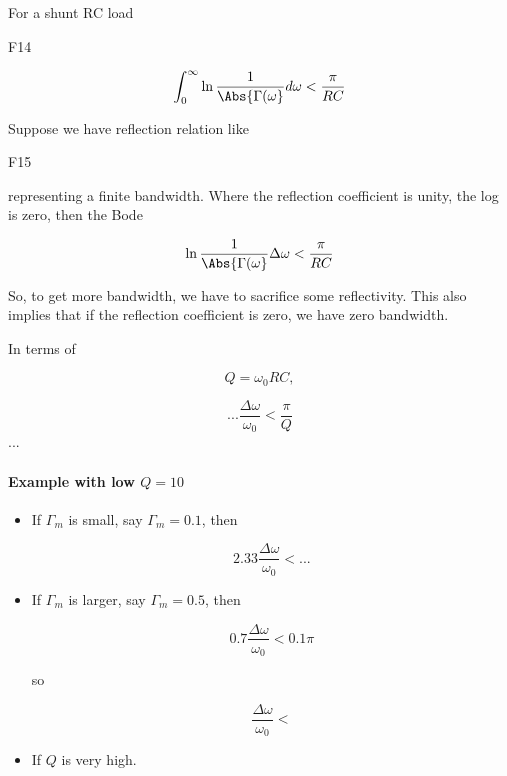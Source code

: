 For a shunt RC load

F14

\begin{equation}\label{eqn:uwavesDeck8ResonatorQfactorCore:n}
\int_0^\infty \ln \frac{1}{\Abs{\Gamma(\omega}} d\omega < \frac{\pi}{R C}
\end{equation}

Suppose we have reflection relation like

F15

representing a finite bandwidth.  Where the reflection coefficient is unity, the log is zero, then the Bode

\begin{equation}\label{eqn:uwavesDeck8ResonatorQfactorCore:n}
\ln \frac{1}{\Abs{\Gamma(\omega}} \Delta\omega < \frac{\pi}{R C}
\end{equation}

So, to get more bandwidth, we have to sacrifice some reflectivity.  This also implies that if the reflection coefficient is zero, we have zero bandwidth.

In terms of

\begin{equation}\label{eqn:uwavesDeck8ResonatorQfactorCore:n}
Q = \omega_0 R C ,
\end{equation}

\begin{equation}\label{eqn:uwavesDeck8ResonatorQfactorCore:n}
... \frac{ \Delta \omega}{\omega_0} < \frac{\pi}{Q}
\end{equation}
...

\paragraph{Example with low \( Q = 10 \) }


\begin{itemize}
\item
If \( \Gamma_m \) is small, say \( \Gamma_m = 0.1 \), then

\begin{equation}\label{eqn:uwavesDeck8ResonatorQfactorCore:n}
2.33 \frac{ \Delta \omega}{\omega_0} < ...
\end{equation}

\item
If \( \Gamma_m \) is larger, say \( \Gamma_m = 0.5 \), then

\begin{equation}\label{eqn:uwavesDeck8ResonatorQfactorCore:n}
0.7 \frac{ \Delta \omega}{\omega_0}  < 0.1 \pi
\end{equation}

so

\begin{equation}\label{eqn:uwavesDeck8ResonatorQfactorCore:n}
\frac{ \Delta \omega}{\omega_0 } <
\end{equation}

\item If \( Q \) is very high.
\end{itemize}

